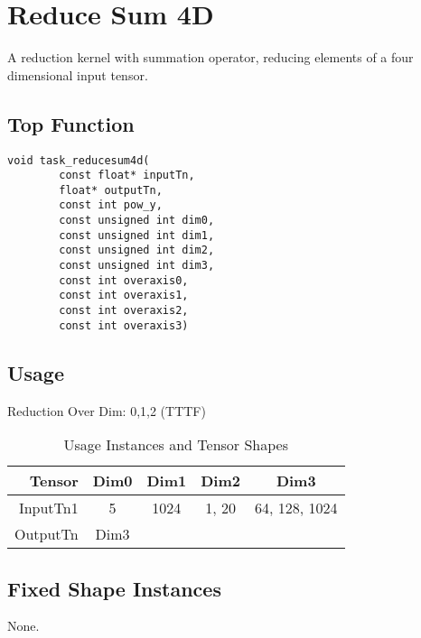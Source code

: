 \documentclass[•]{article}
\begin{document}
\pagebreak






\section{Reduce Sum 4D}
A reduction kernel with summation operator, reducing elements of a four dimensional input tensor.
\subsection{Top Function}
\begin{lstlisting}
void task_reducesum4d(
        const float* inputTn,
        float* outputTn,
        const int pow_y,
        const unsigned int dim0,
        const unsigned int dim1,
        const unsigned int dim2,
        const unsigned int dim3,
        const int overaxis0,
        const int overaxis1,
        const int overaxis2,
        const int overaxis3)
\end{lstlisting}

\subsection{Usage}
Reduction Over Dim: 0,1,2 (TTTF)
\vspace{0.5cm}
\begin{table}[htbp] %
\caption{Usage Instances and Tensor Shapes}
\label{tab:shapes_concat}
	\begin{center}
		\begin{tabular}{|r|c|c|c|c|} 
		\hline	
		Tensor & Dim0 & Dim1 & Dim2 & Dim3\\ 
		\hline	
		InputTn1 &
			5 &
			1024 &
			1, 20 &
			64, 128, 1024 \\ 
		\hline
		OutputTn &
			Dim3 & 
			 & 
			 & 
			 \\
		\hline
		\end{tabular}
	\end{center}
\end{table}

\subsection{Fixed Shape Instances}
None.
\end{document}
